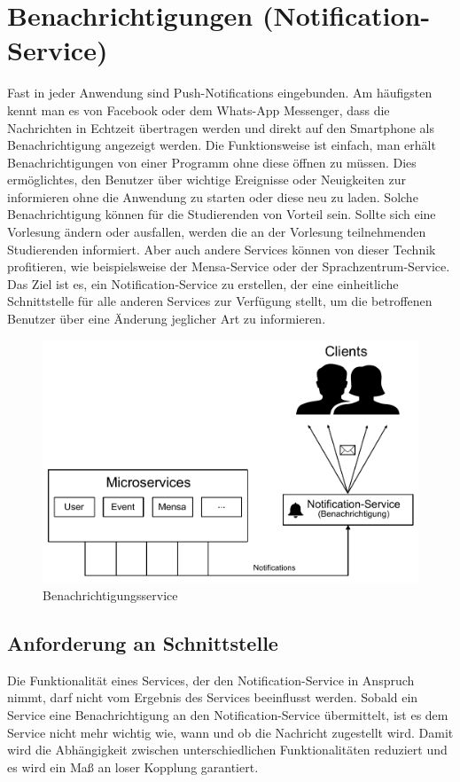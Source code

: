 \section{Benachrichtigungen (Notification-Service)}
\label{sec:notification}
Fast in jeder Anwendung sind Push-Notifications eingebunden. Am häufigsten kennt man es von Facebook oder dem Whats-App Messenger, dass die Nachrichten in Echtzeit übertragen werden und direkt auf den Smartphone als Benachrichtigung angezeigt werden. Die Funktionsweise ist einfach, man erhält Benachrichtigungen von einer Programm ohne diese öffnen zu müssen. Dies ermöglichtes, den Benutzer über wichtige Ereignisse oder Neuigkeiten zur informieren ohne die Anwendung zu starten oder diese neu zu laden. Solche Benachrichtigung können für die Studierenden von Vorteil sein. Sollte sich eine Vorlesung ändern oder ausfallen, werden die an der Vorlesung teilnehmenden Studierenden informiert. Aber auch andere Services können von dieser Technik profitieren, wie beispielsweise der Mensa-Service oder der Sprachzentrum-Service. Das Ziel ist es, ein Notification-Service zu erstellen, der eine einheitliche Schnittstelle für alle anderen Services zur Verfügung stellt, um die betroffenen Benutzer über eine Änderung jeglicher Art zu informieren.

\begin{figure}[H]
\centering
\includegraphics[width=\pictureWidth cm]{Bilder/Prototyp/Notification_Service_Prototype.pdf}
\caption{Benachrichtigungsservice\label{fig:notificationservice}\protect\footnotemark}
\end{figure}


\subsection*{Anforderung an Schnittstelle}
\label{sec:notification_anforderung}
Die Funktionalität eines Services, der den Notification-Service in Anspruch nimmt, darf nicht vom Ergebnis des Services beeinflusst werden. Sobald ein Service eine Benachrichtigung an den Notification-Service übermittelt, ist es dem Service nicht mehr wichtig wie, wann und ob die Nachricht zugestellt wird. Damit wird die Abhängigkeit zwischen unterschiedlichen Funktionalitäten reduziert und es wird ein Maß an loser Kopplung garantiert.

